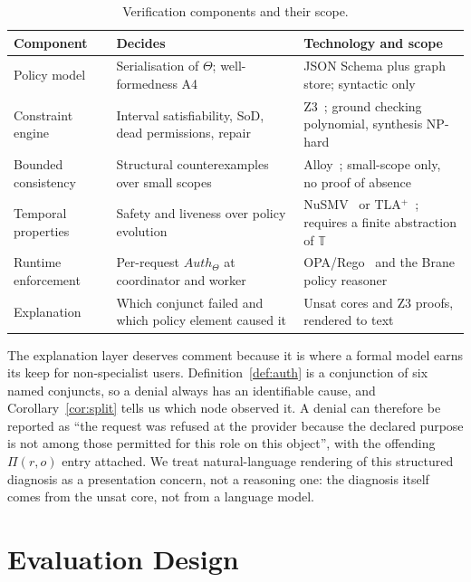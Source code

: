 \documentclass[11pt]{article}
\theoremstyle{definition}
\theoremstyle{plain}
\theoremstyle{remark}
\newcommand{\Auth}{\mathit{Auth}}
\newcommand{\Tdom}{\mathbb{T}}
\begin{document}
\begin{table}[t]
\centering
\caption{Verification components and their scope.}
\label{tab:verification}
\small
\begin{tabular}{p{2.4cm}p{5.2cm}p{4.6cm}}
\toprule
\textbf{Component} & \textbf{Decides} & \textbf{Technology and scope} \\
\midrule
Policy model &
Serialisation of $\Theta$; well-formedness A4 &
JSON Schema plus graph store; syntactic only \\
\addlinespace
Constraint engine &
Interval satisfiability, SoD, dead permissions, repair &
Z3~\citep{demoura2008z3}; ground checking polynomial, synthesis NP-hard \\
\addlinespace
Bounded consistency &
Structural counterexamples over small scopes &
Alloy~\citep{jackson2002alloy}; small-scope only, no proof of absence \\
\addlinespace
Temporal properties &
Safety and liveness over policy evolution &
NuSMV~\citep{cimatti2002nusmv} or TLA$^{+}$~\citep{lamport2002tla}; requires a finite abstraction of $\Tdom$ \\
\addlinespace
Runtime enforcement &
Per-request $\Auth_\Theta$ at coordinator and worker &
OPA/Rego~\citep{opa} and the Brane policy reasoner~\citep{kokash2024reasoner} \\
\addlinespace
Explanation &
Which conjunct failed and which policy element caused it &
Unsat cores and Z3 proofs, rendered to text \\
\bottomrule
\end{tabular}
\end{table}

The explanation layer deserves comment because it is where a formal model earns
its keep for non-specialist users. Definition~\ref{def:auth} is a conjunction of
six named conjuncts, so a denial always has an identifiable cause, and
Corollary~\ref{cor:split} tells us which node observed it. A denial can
therefore be reported as ``the request was refused at the provider because the
declared purpose is not among those permitted for this role on this object'',
with the offending $\Pi(r,o)$ entry attached. We treat natural-language
rendering of this structured diagnosis as a presentation concern, not a
reasoning one: the diagnosis itself comes from the unsat core, not from a
language model.

\section{Evaluation Design}
\label{sec:evaluation}
\end{document}

